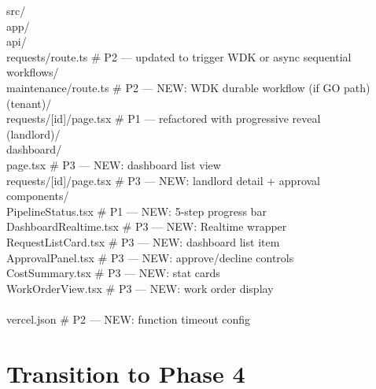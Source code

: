 \documentclass[11pt, a4paper]{article}
\begin{document}
\begin{codebox}
src/\\
\quad app/\\
\quad\quad api/\\
\quad\quad\quad requests/route.ts \quad\quad\quad\quad\quad\# P2 --- updated to trigger WDK or async sequential\\
\quad\quad\quad workflows/\\
\quad\quad\quad\quad maintenance/route.ts \quad\quad\# P2 --- NEW: WDK durable workflow (if GO path)\\
\quad\quad (tenant)/\\
\quad\quad\quad requests/[id]/page.tsx \quad\quad\# P1 --- refactored with progressive reveal\\
\quad\quad (landlord)/\\
\quad\quad\quad dashboard/\\
\quad\quad\quad\quad page.tsx \quad\quad\quad\quad\quad\quad\quad\quad\# P3 --- NEW: dashboard list view\\
\quad\quad\quad\quad requests/[id]/page.tsx \quad\# P3 --- NEW: landlord detail + approval\\
\quad components/\\
\quad\quad PipelineStatus.tsx \quad\quad\quad\quad\quad\# P1 --- NEW: 5-step progress bar\\
\quad\quad DashboardRealtime.tsx \quad\quad\quad\# P3 --- NEW: Realtime wrapper\\
\quad\quad RequestListCard.tsx \quad\quad\quad\quad\# P3 --- NEW: dashboard list item\\
\quad\quad ApprovalPanel.tsx \quad\quad\quad\quad\quad\# P3 --- NEW: approve/decline controls\\
\quad\quad CostSummary.tsx \quad\quad\quad\quad\quad\quad\# P3 --- NEW: stat cards\\
\quad\quad WorkOrderView.tsx \quad\quad\quad\quad\quad\# P3 --- NEW: work order display\\
\\
vercel.json \quad\quad\quad\quad\quad\quad\quad\quad\quad\quad\quad\quad\# P2 --- NEW: function timeout config\\
\end{codebox}

\vspace{1em}

\section{Transition to Phase 4}
\end{document}

